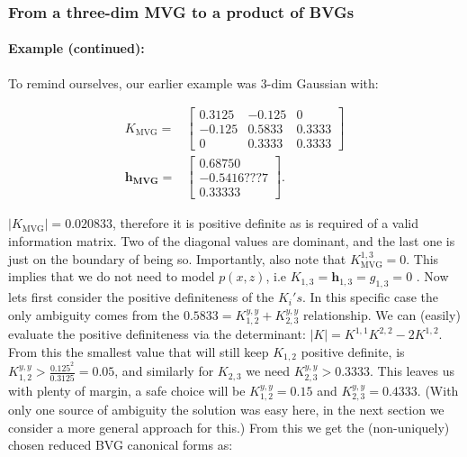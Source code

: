 \subsubsection{From a three-dim MVG to a product of BVGs}


\paragraph{Example (continued):}

To remind ourselves, our earlier example was 3-dim Gaussian with:

\begin{align*}
K_{\mbox{MVG}}= & \left[\begin{array}{rrr}
0.3125 & -0.125 & 0\\
-0.125 & 0.5833 & 0.3333\\
0 & 0.3333 & 0.3333
\end{array}\right]\\
\mathbf{h_{\mbox{MVG}}}= & \left[\begin{array}{r}
0.68750\\
-0.5416???7\\
0.33333
\end{array}\right].
\end{align*}


$|K_{\mbox{MVG}}|=0.020833$, therefore it is positive definite as
is required of a valid information matrix. Two of the diagonal values
are dominant, and the last one is just on the boundary of being so.
Importantly, also note that $K_{\mbox{MVG}}^{1,3}=0$. This implies
that we do not need to model $p(x,z)$, i.e $K_{1,3}=\mathbf{h}_{1,3}=g_{1,3}=0$
. Now lets first consider the positive definiteness of the $K_{i}'s$.
In this specific case the only ambiguity comes from the $0.5833=K_{1,2}^{y,y}+K_{2,3}^{y,y}$
relationship. We can (easily) evaluate the positive definiteness via
the determinant: $|K|=K^{1,1}K^{2,2}-2K^{1,2}$. From this the smallest
value that will still keep $K_{1,2}$ positive definite, is $K_{1,2}^{y,y}>\frac{0.125^{2}}{0.3125}=0.05$,
and similarly for $K_{2,3}$ we need $K_{2,3}^{y,y}>0.3333$. This
leaves us with plenty of margin, a safe choice will be $K_{1,2}^{y,y}=0.15$
and $K_{2,3}^{y,y}=0.4333.$ (With only one source of ambiguity the
solution was easy here, in the next section we consider a more general
approach for this.) From this we get the (non-uniquely) chosen reduced
BVG canonical forms as:

